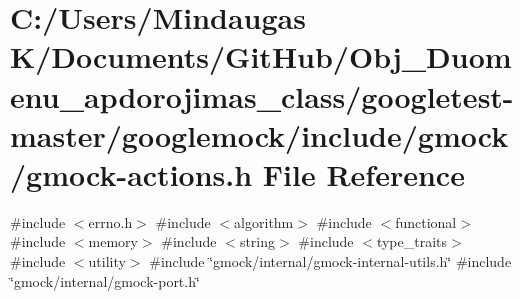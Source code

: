 \hypertarget{googletest-master_2googlemock_2include_2gmock_2gmock-actions_8h}{}\section{C\+:/\+Users/\+Mindaugas K/\+Documents/\+Git\+Hub/\+Obj\+\_\+\+Duomenu\+\_\+apdorojimas\+\_\+class/googletest-\/master/googlemock/include/gmock/gmock-\/actions.h File Reference}
\label{googletest-master_2googlemock_2include_2gmock_2gmock-actions_8h}
{\ttfamily \#include $<$errno.\+h$>$}\newline
{\ttfamily \#include $<$algorithm$>$}\newline
{\ttfamily \#include $<$functional$>$}\newline
{\ttfamily \#include $<$memory$>$}\newline
{\ttfamily \#include $<$string$>$}\newline
{\ttfamily \#include $<$type\+\_\+traits$>$}\newline
{\ttfamily \#include $<$utility$>$}\newline
{\ttfamily \#include \char`\"{}gmock/internal/gmock-\/internal-\/utils.\+h\char`\"{}}\newline
{\ttfamily \#include \char`\"{}gmock/internal/gmock-\/port.\+h\char`\"{}}\newline
